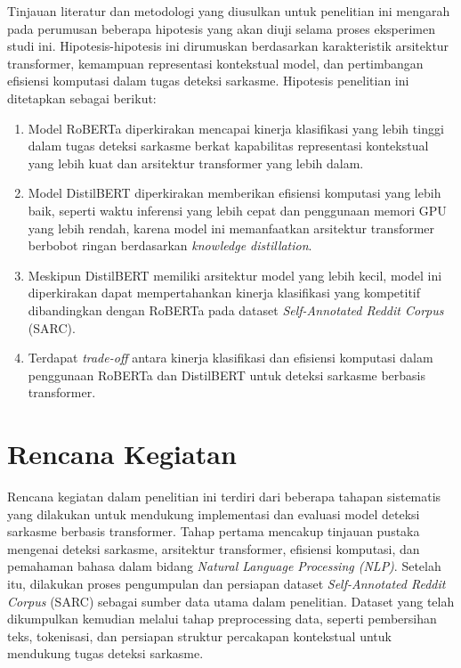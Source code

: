 Tinjauan literatur dan metodologi yang diusulkan untuk penelitian ini mengarah pada perumusan beberapa hipotesis yang akan diuji selama proses eksperimen studi ini. Hipotesis-hipotesis ini dirumuskan berdasarkan karakteristik arsitektur transformer, kemampuan representasi kontekstual model, dan pertimbangan efisiensi komputasi dalam tugas deteksi sarkasme. Hipotesis penelitian ini ditetapkan sebagai berikut:

\begin{enumerate}
    \item Model RoBERTa diperkirakan mencapai kinerja klasifikasi yang lebih tinggi dalam tugas deteksi sarkasme berkat kapabilitas representasi kontekstual yang lebih kuat dan arsitektur transformer yang lebih dalam.
    \item Model DistilBERT diperkirakan memberikan efisiensi komputasi yang lebih baik, seperti waktu inferensi yang lebih cepat dan penggunaan memori GPU yang lebih rendah, karena model ini memanfaatkan arsitektur transformer berbobot ringan berdasarkan \textit{knowledge distillation}.
    \item Meskipun DistilBERT memiliki arsitektur model yang lebih kecil, model ini diperkirakan dapat mempertahankan kinerja klasifikasi yang kompetitif dibandingkan dengan RoBERTa pada dataset \textit{Self-Annotated Reddit Corpus}  (SARC).
    \item Terdapat \textit{trade-off} antara kinerja klasifikasi dan efisiensi komputasi dalam penggunaan RoBERTa dan DistilBERT untuk deteksi sarkasme berbasis transformer.
\end{enumerate}


\section{Rencana Kegiatan}

Rencana kegiatan dalam penelitian ini terdiri dari beberapa tahapan sistematis yang dilakukan untuk mendukung implementasi dan evaluasi model deteksi sarkasme berbasis transformer. Tahap pertama mencakup tinjauan pustaka mengenai deteksi sarkasme, arsitektur transformer, efisiensi komputasi, dan pemahaman bahasa dalam bidang \textit{Natural Language Processing (NLP)}. Setelah itu, dilakukan proses pengumpulan dan persiapan dataset \textit{Self-Annotated Reddit Corpus}  (SARC) sebagai sumber data utama dalam penelitian. Dataset yang telah dikumpulkan kemudian melalui tahap preprocessing data, seperti pembersihan teks, tokenisasi, dan persiapan struktur percakapan kontekstual untuk mendukung tugas deteksi sarkasme.

